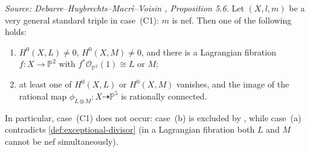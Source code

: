 \begin{proposition}
  \label{prop:nef-case-sfz}
  \textit{Source: Debarre--Huybrechts--Macr\`i--Voisin \cite{MR4654610}, Proposition 5.6.}
  Let \((X, l, m)\) be a very general standard triple in case~(C1): \(m\) is nef.  Then
  one of the following holds:
  \begin{enumerate}
    \item[(a)] \(H^0(X, L) \ne 0\), \(H^0(X, M) \ne 0\), and there is a Lagrangian
      fibration \(f \colon X \to \mathbb{P}^2\) with
      \(f^*\mathcal{O}_{\mathbb{P}^2}(1) \cong L\) or \(M\);
    \item[(b)] at least one of \(H^0(X, L)\) or \(H^0(X, M)\) vanishes, and the image of
      the rational map \(\phi_{L \otimes M} \colon X \dashrightarrow \mathbb{P}^5\) is
      rationally connected.
  \end{enumerate}
  In particular, case~(C1) does not occur: case~(b) is excluded by
  \cite[Theorem~4.2]{voisinfib}, while case~(a) contradicts \cref{def:exceptional-divisor}
  (in a Lagrangian fibration both \(L\) and \(M\) cannot be nef simultaneously).
\end{proposition}

